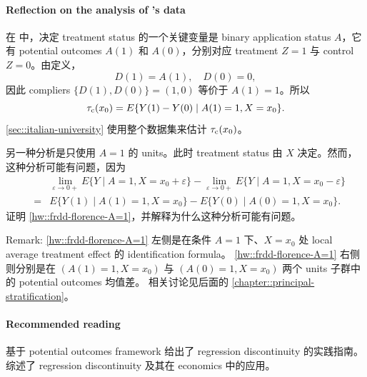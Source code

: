 

\paragraph{Reflection on the analysis of \citet{li2015evaluating}'s data}
\label{problem::italy-srd}

在 \citet{li2015evaluating} 中，决定 treatment status 的一个关键变量是 binary application status $A$，它有 potential outcomes $A(1)$ 和 $A(0)$，分别对应 treatment $Z=1$ 与 control $Z=0$。由定义，
$$
D(1) = A(1), \quad D(0) = 0,
$$
因此 compliers $\{ D(1), D(0) \} = (1,0)$ 等价于 $A(1) = 1$。所以
$$
\tau_{\textup{c}}(x_0) = E\{ Y(1) - Y(0) \mid A(1) = 1, X = x_0 \}. 
$$
\cref{sec::italian-university} 使用整个数据集来估计 $\tau_{\textup{c}}(x_0)$。

另一种分析是只使用 $A=1$ 的 units。此时 treatment status 由 $X$ 决定。然而，这种分析可能有问题，因为
\begin{eqnarray}
&& \lim_{\varepsilon \rightarrow 0+} E\{ Y \mid A  = 1, X = x_0 + \varepsilon \} -\lim_{\varepsilon \rightarrow 0+}  E\{ Y \mid A  = 1, X = x_0- \varepsilon  \}  \nonumber  \\
&=& E\{ Y(1) \mid A(1)  = 1,   X = x_0   \} -  E\{ Y(0) \mid A(0)  = 1,   X = x_0   \} .\label{hw::frdd-florence-A=1}
\end{eqnarray}
证明 \cref{hw::frdd-florence-A=1}，并解释为什么这种分析可能有问题。


Remark: 
\cref{hw::frdd-florence-A=1} 左侧是在条件 $A=1$ 下、$X=x_0$ 处 local average treatment effect 的 identification formula。 \cref{hw::frdd-florence-A=1} 右侧则分别是在 $(A(1)  = 1,   X = x_0 )$ 与 $(A(0)  = 1,   X = x_0)$ 两个 units 子群中的 potential outcomes 均值差。
相关讨论见后面的 \cref{chapter::principal-stratification}。
 


 
 \paragraph{Recommended reading}

\citet{imbens2008regression} 基于 potential outcomes framework 给出了 regression discontinuity 的实践指南。\citet{lee2010regression} 综述了 regression discontinuity 及其在 economics 中的应用。
